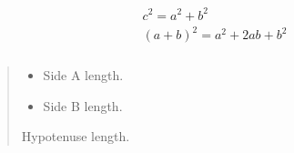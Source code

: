 \documentclass[a4paper,14pt,oneside,english,openany]{sphinxmanual}
\begin{document}
\begin{fulllineitems}
\label{\detokenize{pythagorus:pythagorus.pythagoras}}
\pysigstartsignatures
{}
\pysigstopsignatures\begin{description}
\begin{align*}\!\begin{aligned}
c^2=a^2+b^2\\
(a+b)^2=a^2+2ab+b^2\\
\end{aligned}\end{align*}
\end{description}
\begin{quote}\begin{description}
\begin{itemize}
\item {} 
\sphinxAtStartPar
{} \textendash{} Side A length.

\item {} 
\sphinxAtStartPar
{} \textendash{} Side B length.

\end{itemize}

\sphinxAtStartPar
Hypotenuse length.

\end{description}\end{quote}

\end{fulllineitems}

\end{document}
